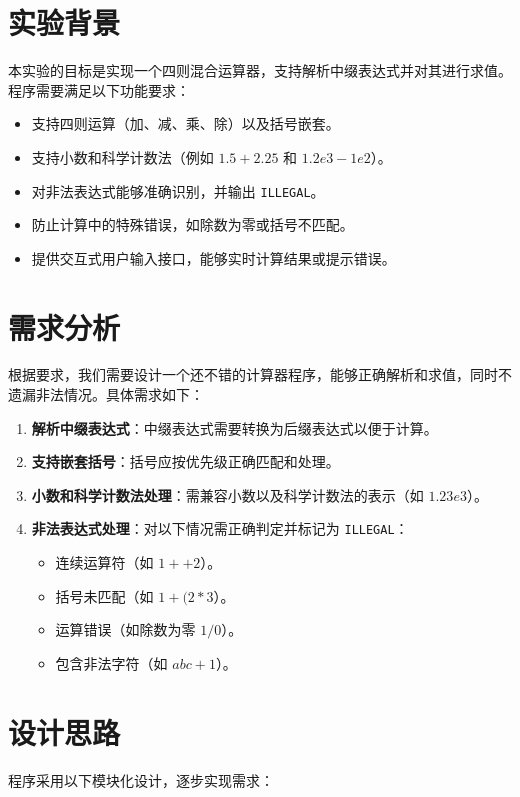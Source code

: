 \documentclass[UTF8]{ctexart}
\begin{document}
\pagestyle{fancy}
\fancyhead{}

\section{实验背景}
本实验的目标是实现一个四则混合运算器，支持解析中缀表达式并对其进行求值。程序需要满足以下功能要求：
\begin{itemize}
    \item 支持四则运算（加、减、乘、除）以及括号嵌套。
    \item 支持小数和科学计数法（例如 $1.5+2.25$ 和 $1.2e3-1e2$）。
    \item 对非法表达式能够准确识别，并输出 \texttt{ILLEGAL}。
    \item 防止计算中的特殊错误，如除数为零或括号不匹配。
    \item 提供交互式用户输入接口，能够实时计算结果或提示错误。
\end{itemize}

\section{需求分析}
根据要求，我们需要设计一个还不错的计算器程序，能够正确解析和求值，同时不遗漏非法情况。具体需求如下：
\begin{enumerate}
    \item \textbf{解析中缀表达式}：中缀表达式需要转换为后缀表达式以便于计算。
    \item \textbf{支持嵌套括号}：括号应按优先级正确匹配和处理。
    \item \textbf{小数和科学计数法处理}：需兼容小数以及科学计数法的表示（如 $1.23e3$）。
    \item \textbf{非法表达式处理}：对以下情况需正确判定并标记为 \texttt{ILLEGAL}：
    \begin{itemize}
        \item 连续运算符（如 $1++2$）。
        \item 括号未匹配（如 $1+(2*3$）。
        \item 运算错误（如除数为零 $1/0$）。
        \item 包含非法字符（如 $abc+1$）。
    \end{itemize}
\end{enumerate}

\section{设计思路}
程序采用以下模块化设计，逐步实现需求：
\end{document}

